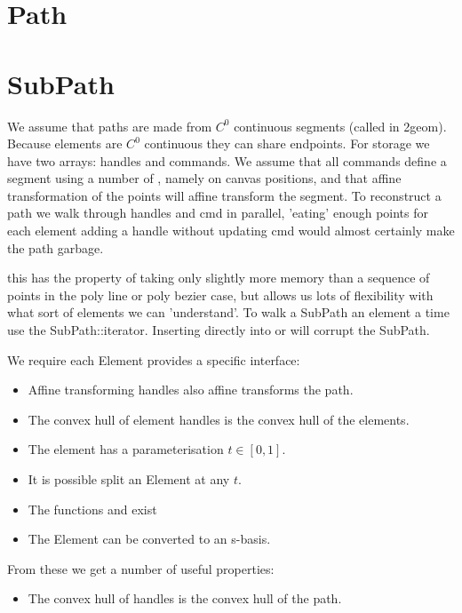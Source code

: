 \section{Path}



\section{SubPath}


We assume that paths are made from $C^0$ continuous segments (called
 in 2geom).  Because elements are $C^0$ continuous
they can share endpoints.  For storage we have two arrays: handles and
commands.  We assume that all commands define a segment using a number
of , namely on canvas positions, and that affine
transformation of the points will affine transform the segment.  To
reconstruct a path we walk through handles and cmd in parallel,
'eating' enough points for each element adding a handle without
updating cmd would almost certainly make the path garbage.

this has the property of taking only slightly more memory than a
sequence of points in the poly line or poly bezier case, but allows us
lots of flexibility with what sort of elements we can 'understand'.
To walk a SubPath an element a time use the SubPath::iterator.
Inserting directly into  or 
will corrupt the SubPath.

We require each Element provides a specific interface:

\begin{itemize}
\item Affine transforming handles also affine transforms the path.
\item The convex hull of element handles is the convex hull of the elements.
\item The element has a parameterisation $t \in [0,1]$.
\item It is possible split an Element at any $t$.
\item The functions  and  exist
\item The Element can be converted to an s-basis.
\end{itemize}

From these we get a number of useful properties:
\begin{itemize}
\item The convex hull of handles is the convex hull of the path.
\end{itemize}

